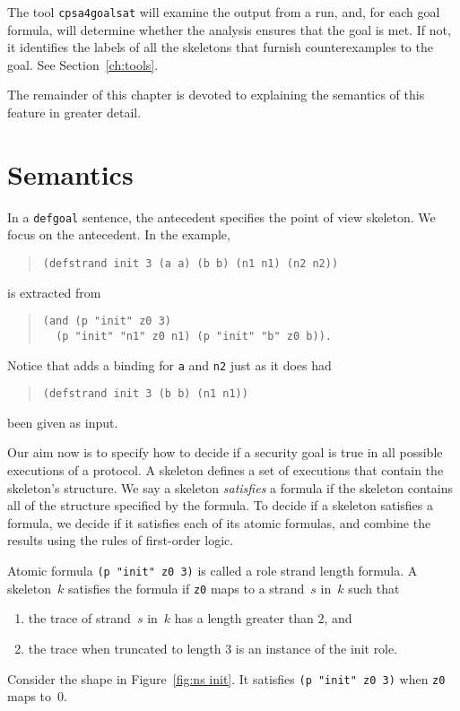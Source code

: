 The tool \texttt{cpsa4goalsat} will examine the output from a {\cpsa}
run, and, for each goal formula, will determine whether the analysis
ensures that the goal is met.  If not, it identifies the labels of all
the skeletons that furnish counterexamples to the goal.  See
Section~\ref{ch:tools}.

The remainder of this chapter is devoted to explaining the semantics
of this feature in greater detail.

\section{Semantics}\label{sec:semantics}

In a \texttt{defgoal} sentence, the antecedent specifies the point of
view skeleton.  We focus on the antecedent.  In the example,

\begin{quote}
\begin{verbatim}
(defstrand init 3 (a a) (b b) (n1 n1) (n2 n2))
\end{verbatim}
\end{quote}
is extracted from
\begin{quote}
\begin{verbatim}
(and (p "init" z0 3)
  (p "init" "n1" z0 n1) (p "init" "b" z0 b)).
\end{verbatim}
\end{quote}
Notice that {\cpsa} adds a binding for \texttt{a} and \texttt{n2} just
as it does had
\begin{quote}
\begin{verbatim}
(defstrand init 3 (b b) (n1 n1))
\end{verbatim}
\end{quote}
been given as input.

Our aim now is to specify how to decide if a security goal is true in
all possible executions of a protocol.  A skeleton defines a set of
executions that contain the skeleton's structure.  We say a skeleton
\emph{satisfies} a formula if the skeleton contains all of the
structure specified by the formula.  To decide if a skeleton
satisfies a formula, we decide if it satisfies each of its atomic
formulas, and combine the results using the rules of first-order
logic.

Atomic formula \texttt{(p "init" z0 3)} is called a role strand length
formula.  A skeleton~$k$ satisfies the formula if \texttt{z0} maps to
a strand~$s$ in~$k$ such that
\begin{enumerate}
\item the trace of strand~$s$ in~$k$ has a length greater than 2, and
\item the trace when truncated to length 3 is an instance of the init
  role.
\end{enumerate}
Consider the shape in Figure~\ref{fig:ns init}.  It satisfies
\texttt{(p "init" z0 3)} when \texttt{z0} maps to~0.

